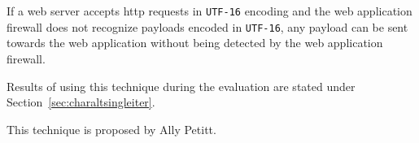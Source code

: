 If a web server accepts \acrshort{http} requests in \verb|UTF-16| encoding and the web application firewall does not recognize payloads encoded in \verb|UTF-16|, any payload can be sent towards the web application without being detected by the web application firewall. 

Results of using this technique during the evaluation are stated under Section~\ref{sec:charaltsingleiter}.

This technique is proposed by Ally Petitt. \cite{medium/allypetitt}
